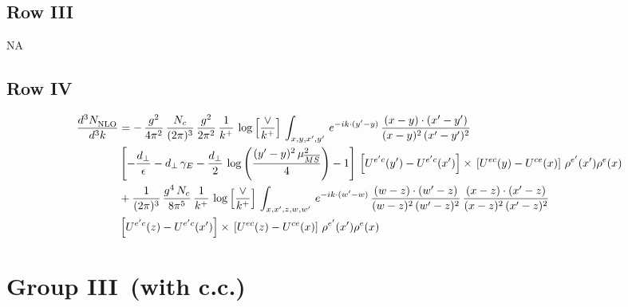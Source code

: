 \documentclass[9pt]{article}
\numberwithin{equation}{section}
\begin{document}
\subsection{Row III}
\textsc{NA}
\subsection{Row IV}
\begin{align}
\frac{d^{3}N_{\rm NLO}^{\rm}}{d^{3}k}  & = -\,\frac{g^{2}}{4\pi^{2}}\, \frac{N_{c}}{(2\pi)^{3}}\,\frac{g^{2}}{2\pi^{2}}\, \frac{1}{k^{+}}\,\log{\left[\frac{\vee}{k^{+}}\right]}\,\int_{x,y,x',y'}\,e^{-ik\cdot (y'-y)}\,\frac{(x-y)\cdot (x'-y')}{(x-y)^{2}\,(x'-y')^{2}}\notag \\
& \left[-\frac{d_{\perp}}{\epsilon}-d_{\perp}\,\gamma_{E}-\frac{d_{\perp}}{2}\,\log{\left(\frac{(y'-y)^{2}\,\mu^{2}_{\overline{MS}}}{4}\right)}-1\right]\,\left[U^{e'c}(y') - U^{e'c}(x')\right] \times\, \left[U^{ec}(y) - U^{ce}(x)\right]\, \rho^{e'}(x') \rho^{e}(x)\notag \\
& +\frac{1}{(2\pi)^{3}}\,\frac{g^{4}\,N_{c}}{8\pi^{5}}\,\frac{1}{k^{+}}\,\log{\left[\frac{\vee}{k^{+}}\right]}\,\int_{x,x',z,w,w'}\,e^{-ik\cdot (w'-w)}\,\frac{(w-z)\cdot(w'-z)}{(w-z)^{2}\,(w'-z)^{2}}\,\frac{(x-z)\cdot(x'-z)}{(x-z)^{2}\,(x'-z)^{2}}\notag \\
& \left[U^{e'c}(z) - U^{e'c}(x')\right] \times\, \left[U^{ec}(z) - U^{ce}(x)\right]\, \rho^{e'}(x') \rho^{e}(x)
\end{align}
\section{Group III\, (with c.c.)}
\end{document}
